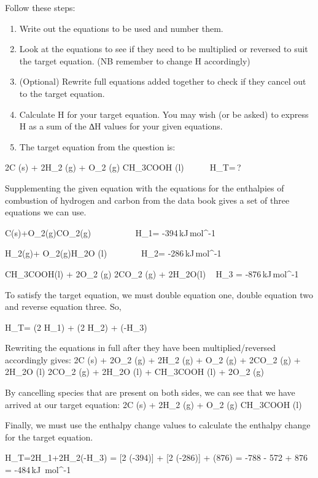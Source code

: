 \documentclass{article}
\begin{document}
Follow these steps:
\begin{enumerate}
\item Write out the equations to be used and number them.
\item Look at the equations to see if they need to be multiplied or reversed to suit the target equation. (NB remember to change \Delta H\) accordingly)

\item (Optional) Rewrite full equations added together to check if they cancel out to the target equation.

\item Calculate \Delta H\) for your target equation. You may wish (or be asked) to express \Delta H\) as a sum of the ∆H values for your given equations.
\item The target equation from the question is:
\end{enumerate}
2C (s)  +  2H_{2} (g)  +  O_{2} (g)  \rightarrow  CH_{3}COOH (l)\,\,\,\,\,\,\,\,\,\,\,\,\,\,\,\,\,\,\Delta H_{T}=\,?

Supplementing the given equation with the equations for the enthalpies of combustion of hydrogen and carbon from the data book gives a set of three equations we can use.

C(s)+O_{2}(g)\rightarrow CO_{2}(g)\,\,\,\,\,\,\,\,\,\,\,\,\,\,\,\,\,\,\,\,\,\,\,\,\,\,\,\,\,\,\,\Delta H_{1}= -394\,kJ\,mol^{-1}

H_{2}(g)+ O_{2}(g)\rightarrow H_{2}O (l)\,\,\,\,\,\,\,\,\,\,\,\,\,\,\,\,\,\,\,\,\,\,\,\,\Delta H_{2}= -286\,kJ\,mol^{-1}

CH_{3}COOH(l)  +  2O_{2} (g) \rightarrow   2CO_{2} (g)  +  2H_{2}O(l)\,\,\,\,\,\,\,\Delta H_{3} = -876\,kJ\,mol^{-1}


To satisfy the target equation, we must double equation one, double equation two and reverse equation three. So,

\Delta H_{T}= (2 \times \Delta H_{1}) + (2 \times \Delta H_{2}) + (-\Delta H_{3})

Rewriting the equations in full after they have been multiplied/reversed accordingly gives:
2C (s) + 2O_{2} (g) + 2H_{2} (g) + O_{2} (g) + 2CO_{2} (g)  +  2H_{2}O (l)
\rightarrow 2CO_{2} (g) + 2H_{2}O (l)  +  CH_{3}COOH (l) + 2O_{2} (g)

By cancelling species that are present on both sides, we can see that we have arrived at our target equation:
2C (s)  +  2H_{2} (g)  +  O_{2} (g)  \rightarrow   CH_{3}COOH (l)

Finally, we must use the enthalpy change values to calculate the enthalpy change for the target equation.

\Delta H_{T}=2\Delta H_{1}+2\Delta H_{2}(-\Delta H_{3})
= [2 \times  (-394)]  +  [2 \times  (-286)]  +  (876)
=  -788  - 572  +  876
=  -484\,kJ\, mol^{-1}
\end{document}
